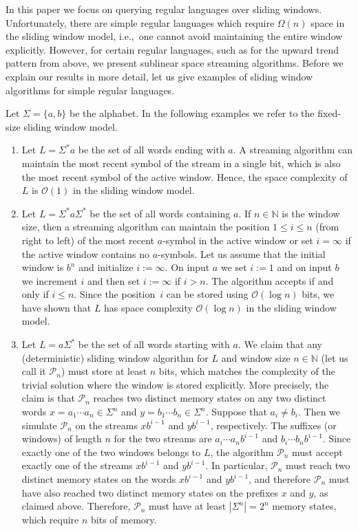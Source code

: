 \documentclass{article}\usepackage[a4paper,margin=20mm]{geometry}
\newcommand{\N}{\mathbb{N}}
\renewcommand{\O}{\mathcal{O}}
\renewcommand{\P}{\mathcal{P}}
\renewcommand{\leq}{\leqslant}
\renewcommand{\le}{\leq}
\begin{document}
In this paper we focus on querying regular languages over sliding windows.
Unfortunately, there are simple regular languages which require $\Omega(n)$ space in the sliding window model,
i.e.,~one cannot avoid maintaining the entire window explicitly.
However, for certain regular languages, such as for the upward trend pattern from above,
we present sublinear space streaming algorithms.
Before we explain our results in more detail, let us give 
examples of sliding window algorithms for simple regular languages.

\begin{example} 
\label{ex:three-sw}
Let $\Sigma = \{a,b\}$ be the alphabet. In the following examples we refer to the fixed-size sliding window model.
\begin{enumerate}[label=(\roman{*}), ref=(\roman{*})]
\item Let $L = \Sigma^* a$ be the set of all words ending with $a$.
A streaming algorithm can maintain the most recent symbol of the stream in a single bit,
which is also the most recent symbol of the active window.
Hence, the space complexity of $L$ is $\O(1)$ in the sliding window model.
\item Let $L = \Sigma^* a \Sigma^*$ be the set of all words containing $a$.
If $n \in \N$ is the window size,
then a streaming algorithm can maintain the position $1 \le i \le n$ (from right to left)
of the most recent $a$-symbol in the active window or set $i = \infty$ if the active window contains no $a$-symbols.
Let us assume that the initial window is $b^n$
and initialize $i := \infty$.
On input $a$ we set $i := 1$
and on input $b$ we increment $i$
and then set $i := \infty$ if $i > n$.
The algorithm accepts if and only if $i \le n$.
Since the position~$i$ can be stored using $\O(\log n)$ bits,
we have shown that $L$ has space complexity $\O(\log n)$ in the sliding window model.

\item Let $L = a \Sigma^*$ be the set of all words starting with $a$.
We claim that any (deterministic) sliding window algorithm for $L$
and window size $n \in \N$ 
(let us call it $\P_n$) must store at least $n$ bits,
which matches the complexity of the trivial solution where the window is stored explicitly.
More precisely, the claim is that $\P_n$ reaches two distinct memory states
on any two distinct words $x = a_1 \cdots a_n \in \Sigma^n$
and $y = b_1 \cdots b_n \in \Sigma^n$.
Suppose that $a_i \neq b_i$.
Then we simulate $\P_n$ on the streams $x b^{i-1}$ and $y b^{i-1}$, respectively.
The suffixes (or windows) of length $n$ for the two streams
are $a_i \cdots a_n b^{i-1}$ and $b_i \cdots b_n b^{i-1}$.
Since exactly one of the two windows belongs to $L$,
the algorithm $\P_n$ must accept exactly one of the streams $x b^{i-1}$ and $y b^{i-1}$.
In particular, $\P_n$ must reach two distinct memory states on the
words $x b^{i-1}$ and $y b^{i-1}$, and
therefore $\P_n$ must have also reached two distinct memory states on the prefixes $x$ and $y$,
as claimed above.
Therefore, $\P_n$ must have at least $|\Sigma^n| = 2^n$ memory states,
which require $n$ bits of memory. \qedhere
\end{enumerate}
\end{example}
\end{document}
